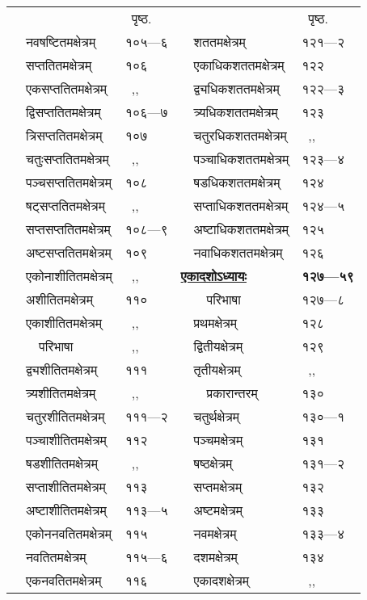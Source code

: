 \documentclass[11pt, openany]{book}
\begin{document}
\newpage
\begin{center}
\begin{tabular}{p{1.4in} l | p{1.6in} l}
& ~पृष्ठ.& & ~पृष्ठ.\\
~~नवषष्टितमक्षेत्रम् & १०५---६ & ~~शततमक्षेत्रम् & १२१---२\\
~~सप्ततितमक्षेत्रम् & १०६ & ~~एकाधिकशततमक्षेत्रम् & १२२\\
~~एकसप्ततितमक्षेत्रम् & ~,, & ~~द्व्यधिकशततमक्षेत्रम् & १२२---३\\
~~द्विसप्ततितमक्षेत्रम् & १०६---७ & ~~त्र्यधिकशततमक्षेत्रम् & १२३\\
~~त्रिसप्ततितमक्षेत्रम् & १०७ & ~~चतुरधिकशततमक्षेत्रम् & ~,,\\
~~चतुःसप्ततितमक्षेत्रम् & ~,, & ~~पञ्चाधिकशततमक्षेत्रम् & १२३---४\\
~~पञ्चसप्ततितमक्षेत्रम् & १०८ & ~~षडधिकशततमक्षेत्रम् & १२४\\
~~षट्सप्ततितमक्षेत्रम् & ~,, & ~~सप्ताधिकशततमक्षेत्रम् & १२४---५\\
~~सप्तसप्ततितमक्षेत्रम् & १०८---९ & ~~अष्टाधिकशततमक्षेत्रम् & १२५\\
~~अष्टसप्ततितमक्षेत्रम् & १०९ & ~~नवाधिकशततमक्षेत्रम् & १२६\\
~~एकोनाशीतितमक्षेत्रम् & ~,, & \hyperref[ch11]{\textbf{एकादशोऽध्यायः}} & \textbf{१२७---५९}\\
~~अशीतितमक्षेत्रम् & ११० & ~~~~परिभाषा & १२७---८\\
~~एकाशीतितमक्षेत्रम् & ~,, & ~~प्रथमक्षेत्रम् & १२८\\
~~~~परिभाषा & ~,, & ~~द्वितीयक्षेत्रम् & १२९\\
~~द्व्यशीतितमक्षेत्रम् & १११ & ~~तृतीयक्षेत्रम् & ~,,\\
~~त्र्यशीतितमक्षेत्रम् & ~,, &  ~~~~प्रकारान्तरम् & १३०\\
~~चतुरशीतितमक्षेत्रम् & १११---२ & ~~चतुर्थक्षेत्रम् & १३०---१\\
~~पञ्चाशीतितमक्षेत्रम् & ११२ & ~~पञ्चमक्षेत्रम् & १३१\\
~~षडशीतितमक्षेत्रम् & ~,, & ~~षष्ठक्षेत्रम् & १३१---२\\
~~सप्ताशीतितमक्षेत्रम् & ११३ & ~~सप्तमक्षेत्रम् & १३२\\
~~अष्टाशीतितमक्षेत्रम् & ११३---५ & ~~अष्टमक्षेत्रम् & १३३\\
~~एकोननवतितमक्षेत्रम् & ११५ & ~~नवमक्षेत्रम् & १३३---४\\
~~नवतितमक्षेत्रम् & ११५---६ & ~~दशमक्षेत्रम् & १३४\\
~~एकनवतितमक्षेत्रम् & ११६ & ~~एकादशक्षेत्रम् & ~,,\\

\end{tabular}
\end{center}
\end{document}
